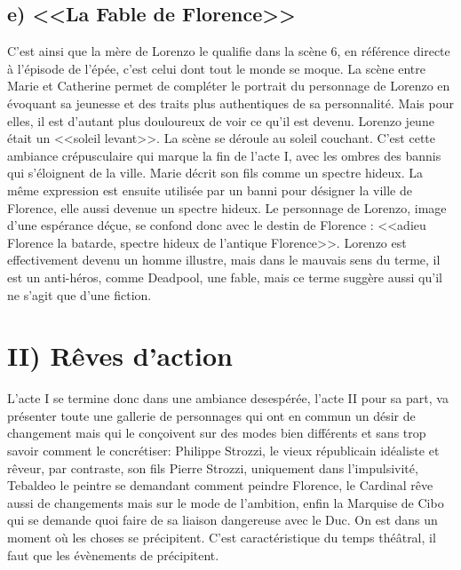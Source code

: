 \documentclass[12pt]{article}
\begin{document}
\subsection*{e) <<La Fable de Florence>>}
C'est ainsi que la mère de Lorenzo le qualifie dans la scène 6, en référence directe à l'épisode de l'épée, c'est celui dont tout le monde se moque.
La scène entre Marie et Catherine permet de compléter le portrait du personnage de Lorenzo en évoquant sa jeunesse et des traits plus authentiques de sa personnalité. Mais pour elles, il est d'autant plus douloureux de voir ce qu'il est devenu.
Lorenzo jeune était un <<soleil levant>>. La scène se déroule au soleil couchant.
C'est cette ambiance crépusculaire qui marque la fin de l'acte I, avec les ombres des bannis qui s'éloignent de la ville.
Marie décrit son fils comme un spectre hideux. La même expression est ensuite utilisée par un banni pour désigner la ville de Florence, elle aussi devenue un spectre hideux.
Le personnage de Lorenzo, image d'une espérance déçue, se confond donc avec le destin de Florence : <<adieu Florence la batarde, spectre hideux de l'antique Florence>>.
Lorenzo est effectivement devenu un homme illustre, mais dans le mauvais sens du terme, il est un anti-héros, comme Deadpool, une fable, mais ce terme suggère aussi qu'il ne s'agit que d'une fiction.
\section*{\color{red}II) Rêves d'action}
L'acte I se termine donc dans une ambiance desespérée, l'acte II pour sa part, va présenter toute une gallerie de personnages qui ont en commun un désir de changement mais qui le conçoivent sur des modes bien différents et sans trop savoir comment le concrétiser: Philippe Strozzi, le vieux républicain idéaliste et rêveur, par contraste, son fils Pierre Strozzi, uniquement dans l'impulsivité, Tebaldeo le peintre se demandant comment peindre Florence, le Cardinal rêve aussi de changements mais sur le mode de l'ambition, enfin la Marquise de Cibo qui se demande quoi faire de sa liaison dangereuse avec le Duc.
On est dans un moment où les choses se précipitent. C'est caractéristique du temps théâtral, il faut que les évènements de précipitent.
\end{document}
